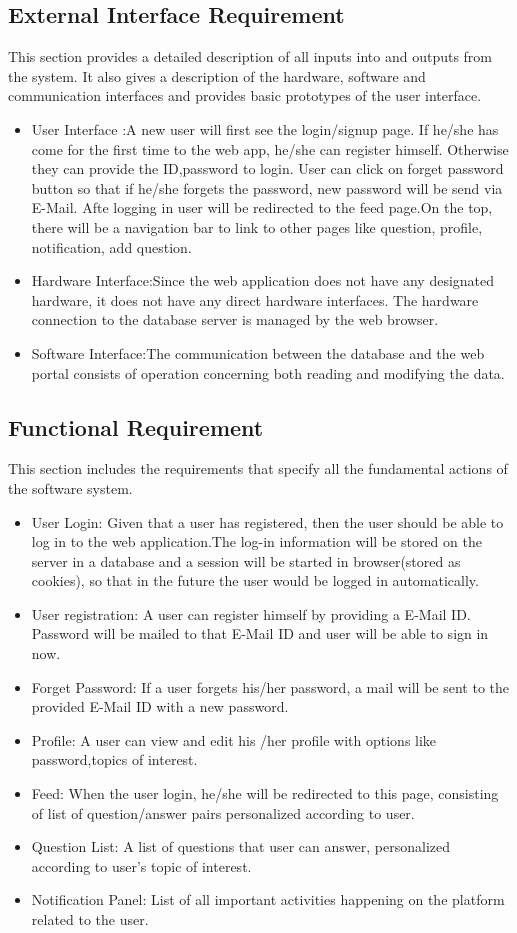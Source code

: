 \documentclass[journal,12pt,onecolumn,draftclsnofoot,]{IEEEtran}
\begin{document}
\subsection{External Interface Requirement}
This section provides a detailed description of all inputs into and outputs from the system. It also gives a description of the hardware, software and communication interfaces and provides basic prototypes of the user interface.
\begin{itemize}
\item User Interface :A new user will first see the login/signup page. If he/she has come for the first time to the web app, he/she can register himself. Otherwise they can provide the ID,password to login. User can click on forget password button so that if he/she forgets the password, new password will be send via E-Mail. Afte logging in user will be redirected to the feed page.On the top, there will be a navigation bar to link to other pages like question, profile, notification, add question.
\item Hardware Interface:Since the web application does not have any designated hardware, it does not have any direct hardware interfaces. The hardware connection to the database server is managed by the web browser.
\item Software Interface:The communication between the database and the web portal consists of operation concerning both reading and modifying the data.
\end{itemize}

\subsection{Functional Requirement}
This section includes the requirements that specify all the fundamental actions of the software system.
\begin{itemize}
\item User Login: Given that a user has registered, then the user should be able to log in to the web application.The log-in information will be stored on the server in a database and a session will be started in browser(stored as cookies), so that in the future the user would be logged in automatically.
\item User registration: A user can register himself by providing a E-Mail ID. Password will be mailed to that E-Mail ID and user will be able to sign in now.
\item Forget Password: If a user forgets his/her password, a mail will be sent to the provided E-Mail ID with a new password.
\item Profile: A user can view and edit his /her profile with options like password,topics of interest.
\item Feed: When the user login, he/she will be redirected to this page, consisting of list of question/answer pairs personalized according to user.
\item Question List: A list of questions that user can answer, personalized according to user's topic of interest.
\item Notification Panel: List of all important activities happening on the platform related to the user.
\end{itemize}
\end{document}

